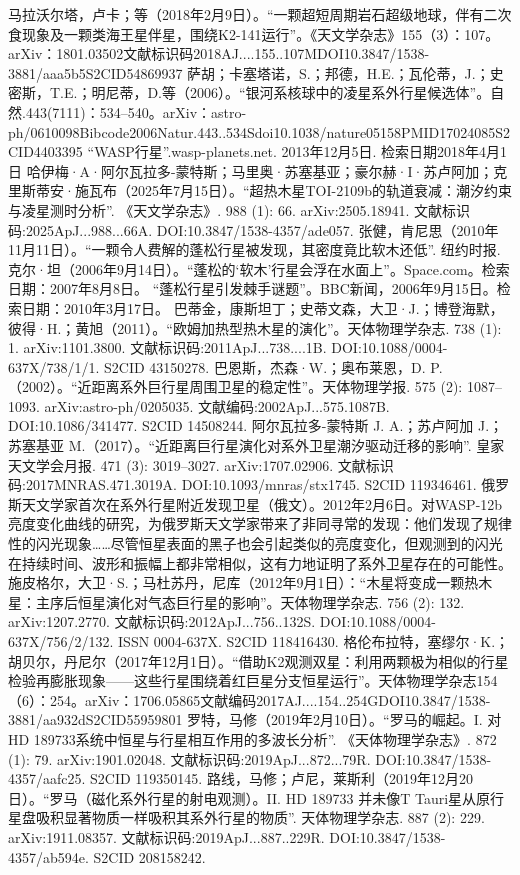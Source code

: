 \begin{enumerate}
 马拉沃尔塔，卢卡；等（2018年2月9日）。“一颗超短周期岩石超级地球，伴有二次食现象及一颗类海王星伴星，围绕K2-141运行”。《天文学杂志》155（3）：107。arXiv：1801.03502文献标识码2018AJ....155..107MDOI10.3847/1538-3881/aaa5b5S2CID54869937
 萨胡；卡塞塔诺，S.；邦德，H.E.；瓦伦蒂，J.；史密斯，T.E.；明尼蒂，D.等（2006）。“银河系核球中的凌星系外行星候选体”。自然.443(7111)：534–540。arXiv：astro-ph/0610098Bibcode2006Natur.443..534Sdoi10.1038/nature05158PMID17024085S2CID4403395
 “WASP行星”.wasp-planets.net. 2013年12月5日. 检索日期2018年4月1日
 哈伊梅·A·阿尔瓦拉多-蒙特斯；马里奥·苏塞基亚；豪尔赫·I·苏卢阿加；克里斯蒂安·施瓦布（2025年7月15日）。“超热木星TOI-2109b的轨道衰减：潮汐约束与凌星测时分析”. 《天文学杂志》. 988 (1): 66. arXiv:2505.18941. 文献标识码:2025ApJ...988...66A. DOI:10.3847/1538-4357/ade057.
 张健，肯尼思（2010年11月11日）。“一颗令人费解的蓬松行星被发现，其密度竟比软木还低”. 纽约时报.
 克尔·坦（2006年9月14日）。“蓬松的‘软木’行星会浮在水面上”。Space.com。检索日期：2007年8月8日。
 “蓬松行星引发棘手谜题”。BBC新闻，2006年9月15日。检索日期：2010年3月17日。
 巴蒂金，康斯坦丁；史蒂文森，大卫·J.；博登海默，彼得·H.；黄旭（2011）。“欧姆加热型热木星的演化”。天体物理学杂志. 738 (1): 1. arXiv:1101.3800. 文献标识码:2011ApJ...738....1B. DOI:10.1088/0004-637X/738/1/1. S2CID 43150278.
 巴恩斯，杰森·W.；奥布莱恩，D. P.（2002）。“近距离系外巨行星周围卫星的稳定性”。天体物理学报. 575 (2): 1087–1093. arXiv:astro-ph/0205035. 文献编码:2002ApJ...575.1087B. DOI:10.1086/341477. S2CID 14508244.
 阿尔瓦拉多-蒙特斯 J. A.；苏卢阿加 J.；苏塞基亚 M.（2017）。“近距离巨行星演化对系外卫星潮汐驱动迁移的影响”. 皇家天文学会月报. 471 (3): 3019–3027. arXiv:1707.02906. 文献标识码:2017MNRAS.471.3019A. DOI:10.1093/mnras/stx1745. S2CID 119346461.
 俄罗斯天文学家首次在系外行星附近发现卫星（俄文）。2012年2月6日。对WASP-12b亮度变化曲线的研究，为俄罗斯天文学家带来了非同寻常的发现：他们发现了规律性的闪光现象……尽管恒星表面的黑子也会引起类似的亮度变化，但观测到的闪光在持续时间、波形和振幅上都非常相似，这有力地证明了系外卫星存在的可能性。
 施皮格尔，大卫·S.；马杜苏丹，尼库（2012年9月1日）：“木星将变成一颗热木星：主序后恒星演化对气态巨行星的影响”。天体物理学杂志. 756 (2): 132. arXiv:1207.2770. 文献标识码:2012ApJ...756..132S. DOI:10.1088/0004-637X/756/2/132. ISSN 0004-637X. S2CID 118416430.
 格伦布拉特，塞缪尔·K.；胡贝尔，丹尼尔（2017年12月1日）。“借助K2观测双星：利用两颗极为相似的行星检验再膨胀现象——这些行星围绕着红巨星分支恒星运行”。天体物理学杂志154（6）：254。arXiv：1706.05865文献编码2017AJ....154..254GDOI10.3847/1538-3881/aa932dS2CID55959801
 罗特，马修（2019年2月10日）。“罗马的崛起。I. 对HD 189733系统中恒星与行星相互作用的多波长分析”. 《天体物理学杂志》. 872 (1): 79. arXiv:1901.02048. 文献标识码:2019ApJ...872...79R. DOI:10.3847/1538-4357/aafc25. S2CID 119350145.
 路线，马修；卢尼，莱斯利（2019年12月20日）。“罗马（磁化系外行星的射电观测）。II. HD 189733 并未像T Tauri星从原行星盘吸积显著物质一样吸积其系外行星的物质”. 天体物理学杂志. 887 (2): 229. arXiv:1911.08357. 文献标识码:2019ApJ...887..229R. DOI:10.3847/1538-4357/ab594e. S2CID 208158242.
\end{enumerate}

